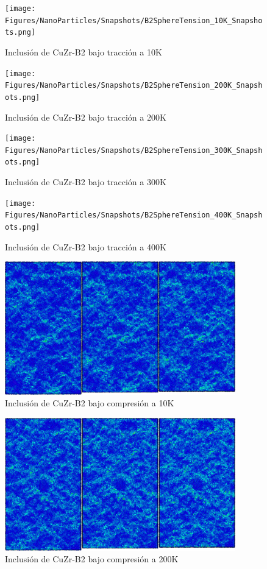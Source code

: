 \documentclass[10pt, oneside]{article} %
\begin{document}
\begin{figure}[H]
\centering
\texttt{[image: Figures/NanoParticles/Snapshots/B2SphereTension\_10K\_Snapshots.png]}
\caption{Inclusión de CuZr-B2 bajo tracción a 10K}
\end{figure}

\begin{figure}[H]
\centering
\texttt{[image: Figures/NanoParticles/Snapshots/B2SphereTension\_200K\_Snapshots.png]}
\caption{Inclusión de CuZr-B2 bajo tracción a 200K}
\end{figure}

\begin{figure}[H]
\centering
\texttt{[image: Figures/NanoParticles/Snapshots/B2SphereTension\_300K\_Snapshots.png]}
\caption{Inclusión de CuZr-B2 bajo tracción a 300K}
\end{figure}

\begin{figure}[H]
\centering
\texttt{[image: Figures/NanoParticles/Snapshots/B2SphereTension\_400K\_Snapshots.png]}
\caption{Inclusión de CuZr-B2 bajo tracción a 400K}
\end{figure}

\begin{figure}[H]
\centering
\includegraphics[width=10cm]{Figures/NanoParticles/Snapshots/B2SphereCompression_10K_Snapshots.png}
\caption{Inclusión de CuZr-B2 bajo compresión a 10K}
\end{figure}

\begin{figure}[H]
\centering
\includegraphics[width=10cm]{Figures/NanoParticles/Snapshots/B2SphereCompression_200K_Snapshots.png}
\caption{Inclusión de CuZr-B2 bajo compresión a 200K}
\end{figure}
\end{document}
